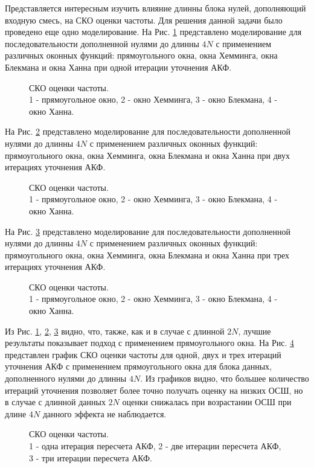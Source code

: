 Представляется интересным изучить влияние длинны блока нулей, дополняющий входную смесь, на СКО оценки частоты. Для решения данной задачи было проведено еще одно моделирование.
На Рис. \ref{pic:fft4_1} представлено моделирование для последовательности дополненной нулями до длинны ${4N}$ с применением различных оконных функций:
прямоугольного окна, окна Хемминга, окна Блекмана и окна Ханна при одной итерации уточнения АКФ.
\begin{figure}[h]
	\center{}
	\caption{СКО оценки частоты.\\1 - прямоугольное окно, 2 - окно Хемминга, 3 - окно Блекмана, 4 - окно Ханна.}
	\label{pic:fft4_1}
\end{figure}

На Рис. \ref{pic:fft4_2} представлено моделирование для последовательности дополненной нулями до длинны ${4N}$ с применением различных оконных функций:
прямоугольного окна, окна Хемминга, окна Блекмана и окна Ханна при двух итерациях уточнения АКФ.
\begin{figure}[h]
	\center{}
	\caption{СКО оценки частоты.\\1 - прямоугольное окно, 2 - окно Хемминга, 3 - окно Блекмана, 4 - окно Ханна.}
	\label{pic:fft4_2}
\end{figure}

На Рис. \ref{pic:fft4_3} представлено моделирование для последовательности дополненной нулями до длинны ${4N}$ с применением различных оконных функций:
прямоугольного окна, окна Хемминга, окна Блекмана и окна Ханна при трех итерациях уточнения АКФ.
\begin{figure}[h]
	\center{}
	\caption{СКО оценки частоты.\\1 - прямоугольное окно, 2 - окно Хемминга, 3 - окно Блекмана, 4 - окно Ханна.}
	\label{pic:fft4_3}
\end{figure}

Из Рис. \ref{pic:fft4_1}, \ref{pic:fft4_2}, \ref{pic:fft4_3} видно, что, также, как и в случае с длинной ${2N}$, лучшие результаты показывает подход с применением прямоугольного окна.
На Рис. \ref{pic:fft4_rect_1_2_3}
представлен график СКО оценки частоты для одной, двух и трех итераций уточнения АКФ с применением прямоугольного окна для блока данных, дополненного нулями до длинны ${4N}$.
Из графиков видно, что большее количество итераций уточнения позволяет более точно получать оценку на низких ОСШ, но в случае с длинной данных ${2N}$ оценки снижалась при
возрастании ОСШ при длине ${4N}$ данного эффекта не наблюдается.
\begin{figure}[h]
	\center{}
	\caption{СКО оценки частоты.\\1 - одна итерация пересчета АКФ, 2 - две итерации пересчета АКФ, 3 - три итерации пересчета АКФ.}
	\label{pic:fft4_rect_1_2_3}
\end{figure}

